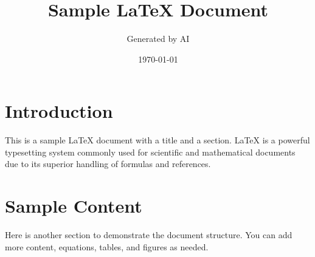\documentclass{article}
\title{Sample LaTeX Document}
\author{Generated by AI}
\date{\today}
\begin{document}
\maketitle

\section{Introduction}
This is a sample LaTeX document with a title and a section. LaTeX is a powerful typesetting system commonly used for scientific and mathematical documents due to its superior handling of formulas and references.

\section{Sample Content}
Here is another section to demonstrate the document structure. You can add more content, equations, tables, and figures as needed.
\end{document}

